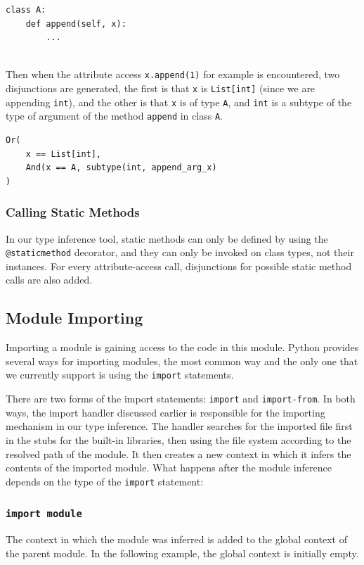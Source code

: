 \begin{lstlisting}
class A:
	def append(self, x):
		...
		
\end{lstlisting}

Then when the attribute access \lstinline|x.append(1)| for example is encountered, two disjunctions are generated, the first is that \lstinline|x| is \lstinline|List[int]| (since we are appending \lstinline|int|), and the other is that \lstinline|x| is of type \lstinline|A|, and \lstinline|int| is a subtype of the type of argument of the method \lstinline|append| in class \lstinline|A|.

\begin{lstlisting}
Or(
	x == List[int],
	And(x == A, subtype(int, append_arg_x)
)
\end{lstlisting}

\subsubsection{Calling Static Methods}
In our type inference tool, static methods can only be defined by using the \lstinline|@staticmethod| decorator, and they can only be invoked on class types, not their instances. For every attribute-access call, disjunctions for possible static method calls are also added.

\subsection{Module Importing}
Importing a module is gaining access to the code in this module. Python provides several ways for importing modules, the most common way and the only one that we currently support is using the \lstinline|import| statements.

There are two forms of the import statements: \lstinline|import| and \lstinline|import-from|. In both ways, the import handler discussed earlier is responsible for the importing mechanism in our type inference. The handler searches for the imported file first in the stubs for the built-in libraries, then using the file system according to the resolved path of the module. It then creates a new context in which it infers the contents of the imported module. What happens after the module inference depends on the type of the \lstinline|import| statement:

\subsubsection{\lstinline|import module|}
The context in which the module was inferred is added to the global context of the parent module. In the following example, the global context is initially empty.

